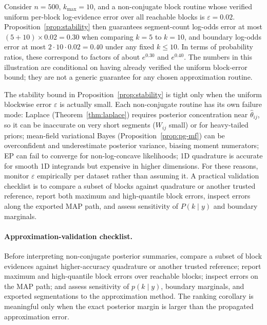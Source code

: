 \begin{remark}
\label{rem:stability-numerical}
Consider $n=500$, $k_{\max}=10$, and a non-conjugate block routine whose verified uniform
per-block log-evidence error over all reachable blocks is $\varepsilon=0.02$. Proposition~\ref{prop:stability}
then guarantees segment-count log-odds error at most $(5+10)\times0.02=0.30$ when comparing
$k=5$ to $k=10$, and boundary log-odds error at most $2\cdot10\cdot0.02=0.40$ under any fixed
$k\le10$. In terms of probability ratios, these correspond to factors of about $e^{0.30}$ and
$e^{0.40}$. The numbers in this illustration are conditional on having already verified the
uniform block-error bound; they are not a generic guarantee for any chosen approximation routine.
\end{remark}

\begin{remark}
\label{rem:failure-modes}
The stability bound in Proposition~\ref{prop:stability} is tight only when the uniform blockwise
error $\varepsilon$ is actually small. Each non-conjugate routine has its own failure mode:
Laplace (Theorem~\ref{thm:laplace}) requires posterior concentration near $\hat\theta_{ij}$, so
it can be inaccurate on very short segments ($W_{ij}$ small) or for heavy-tailed priors;
mean-field variational Bayes (Proposition~\ref{prop:pg-mf}) can be overconfident and
underestimate posterior variance, biasing moment numerators; EP can fail to converge for
non-log-concave likelihoods; 1D quadrature is accurate for smooth 1D integrands but expensive
in higher dimensions. For these reasons, monitor $\varepsilon$ empirically per
dataset rather than assuming it. A practical validation checklist is to compare a subset of blocks against
quadrature or another trusted reference, report both maximum and high-quantile block errors, inspect
errors along the exported MAP path, and assess sensitivity of $P(k\mid y)$ and boundary marginals.
\end{remark}

\paragraph{Approximation-validation checklist.}
Before interpreting non-conjugate posterior summaries, compare a subset of block evidences against
higher-accuracy quadrature or another trusted reference; report maximum and high-quantile block
errors over reachable blocks; inspect errors on the MAP path; and assess sensitivity of $p(k\mid y)$,
boundary marginals, and exported segmentations to the approximation method. The ranking corollary
is meaningful only when the exact posterior margin is larger than the propagated approximation error.


